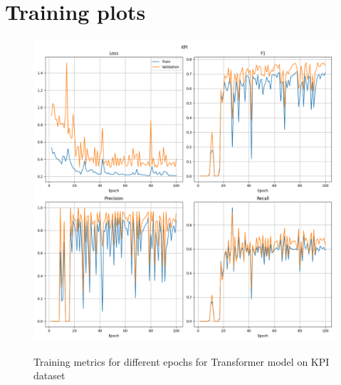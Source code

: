 \documentclass[a4paper, twoside]{report}
\theoremstyle{definition}
\numberwithin{equation}{section}
\begin{document}
\newpage
\appendix
\chapter{Training plots} \label{app:training_plots}

\begin{figure}[h!]
    \centering
    \caption{Training metrics for different epochs for Transformer model on KPI dataset}
    \includegraphics[width=\textwidth]{plots/Transformer_KPI.png}
    \label{fig:Transformer_KPI_training}
\end{figure}
\end{document}
